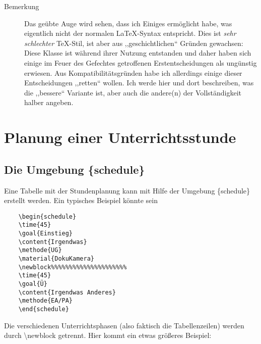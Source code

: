 \documentclass[hyperworksheet]{drcschool}
\newcommand*{\cs}[1]{\textup{\ttfamily\textbackslash#1}}                   %
\newcommand*{\env}[1]{\textup{\ttfamily\{#1\}}}                            %
\begin{document}
\begin{description}
\item[Bemerkung]
Das geübte Auge wird sehen, dass ich Einiges ermöglicht habe, was eigentlich
nicht der normalen \LaTeX-Syntax entspricht.
Dies ist \emph{sehr schlechter} \TeX-Stil,
ist aber aus ,,geschichtlichen`` Gründen gewachsen: Diese Klasse ist während ihrer Nutzung
entstanden und daher haben sich einige im Feuer des Gefechtes getroffenen
Erstentscheidungen als ungünstig erwiesen. Aus Kompatibilitätsgründen habe
ich allerdings einige dieser Entscheidungen ,,retten`` wollen. Ich werde
hier und dort beschreiben, was die ,,bessere`` Variante ist, aber auch die andere(n)
der Vollständigkeit halber angeben.
\end{description}

\section{Planung einer Unterrichtsstunde}
\subsection{Die Umgebung \{schedule\}}
Eine Tabelle mit der Stundenplanung kann mit Hilfe der Umgebung  \env{schedule} erstellt werden.
Ein typisches Beispiel könnte sein
\begin{verbatim}
    \begin{schedule}
    \time{45}
    \goal{Einstieg}
    \content{Irgendwas}
    \methode{UG}
    \material{DokuKamera}
    \newblock%%%%%%%%%%%%%%%%%%%%%
    \time{45}
    \goal{Ü}
    \content{Irgendwas Anderes}
    \methode{EA/PA}
    \end{schedule}
\end{verbatim}
Die verschiedenen Unterrichtsphasen (also faktisch die Tabellenzeilen) werden durch \cs{newblock}
getrennt. Hier kommt ein etwas größeres Beispiel:

\end{document}
